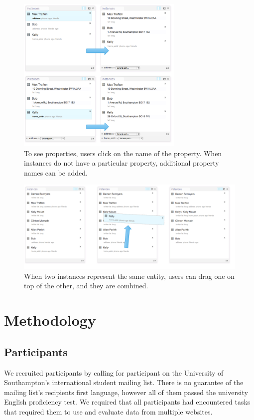 \documentclass{sigchi}
\begin{document}
\begin{figure}[htbp]
\begin{center}
\includegraphics[width=8cm]{img/multipathing}
\caption{To see properties, users click on the name of the property. When instances do not have a particular property, additional property names can be added.}
\label{fig:multipathing}
\end{center}
\end{figure}

\begin{figure}[htbp]
\begin{center}
\includegraphics[width=18cm]{img/sameas}
\caption{When two instances represent the same entity, users can drag one on top of the other, and they are combined.}
\label{fig:sameas}
\end{center}
\end{figure}


\section{Methodology}

\subsection{Participants}
We recruited participants by calling for participant on the University of Southampton's international student mailing list.  There is no guarantee of the mailing list's recipients first language, however all of them passed the university English proficiency test.  We required that all participants had encountered tasks that required them to use and evaluate data from multiple websites.
\end{document}
